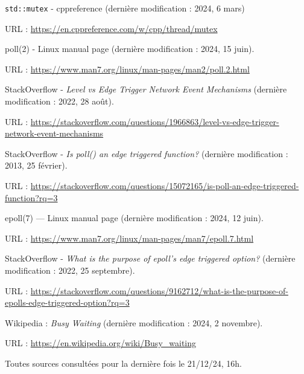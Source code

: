 \documentclass{article}
\begin{document}
\begin{thebibliography}{999}
    \texttt{std::mutex} - cppreference (dernière modification : 2024, 6 mars)

    URL : \url{https://en.cppreference.com/w/cpp/thread/mutex}

    poll(2) - Linux manual page (dernière modification : 2024, 15 juin).

    URL : \url{https://www.man7.org/linux/man-pages/man2/poll.2.html}


    StackOverflow - \textit{Level vs Edge Trigger Network Event Mechanisms} (dernière modification : 2022, 28 août).

    URL : \url{https://stackoverflow.com/questions/1966863/level-vs-edge-trigger-network-event-mechanisms}

    StackOverflow - \textit{Is poll() an edge triggered function?} (dernière modification : 2013, 25 février).

    URL : \url{https://stackoverflow.com/questions/15072165/is-poll-an-edge-triggered-function?rq=3}

    epoll(7) — Linux manual page (dernière modification : 2024, 12 juin).

    URL : \url{https://www.man7.org/linux/man-pages/man7/epoll.7.html}

    StackOverflow - \textit{What is the purpose of epoll's edge triggered option?} (dernière modification : 2022, 25 septembre).

    URL : \url{https://stackoverflow.com/questions/9162712/what-is-the-purpose-of-epolls-edge-triggered-option?rq=3}

    Wikipedia : \textit{Busy Waiting} (dernière modification : 2024, 2 novembre).

    URL : \url{https://en.wikipedia.org/wiki/Busy_waiting}
\end{thebibliography}
Toutes sources consultées pour la dernière fois le 21/12/24, 16h.
    
\end{document}
